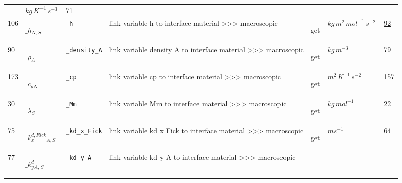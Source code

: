 \begin{longtable}{|p{1cm}|p{2.5cm}|p{4.5cm}|p{8cm}|p{3.0cm}|p{3cm}|p{1cm}|}
             & $ kg \,K^{-1} \,s^{-3} \, $
             &                 \hyperlink{"e:71"}{ 71 }
                 \\
            106
             & \hypertarget{"v:106"}{ $ {{\_h}}{_{N, S}} $}
             & \verb|_h|
             & link variable h to interface material >>> macroscopic
             & \begin{lay}get \end{lay}
             & $ kg \,m^{2} \,mol^{-1} \,s^{-2} \, $
             &                 \hyperlink{"e:92"}{ 92 }
                 \\
            90
             & \hypertarget{"v:90"}{ $ {{\_\rho}}{_{A}} $}
             & \verb|_density_A|
             & link variable density A to interface material >>> macroscopic
             & \begin{lay}get \end{lay}
             & $ kg \,m^{-3} \, $
             &                 \hyperlink{"e:79"}{ 79 }
                 \\
            173
             & \hypertarget{"v:173"}{ $ {{\_c_p}}{_{N}} $}
             & \verb|_cp|
             & link variable cp to interface material >>> macroscopic
             & \begin{lay}get \end{lay}
             & $ m^{2} \,K^{-1} \,s^{-2} \, $
             &                 \hyperlink{"e:157"}{ 157 }
                 \\
            30
             & \hypertarget{"v:30"}{ $ {{\_\lambda}}{_{S}} $}
             & \verb|_Mm|
             & link variable Mm to interface material >>> macroscopic
             & \begin{lay}get \end{lay}
             & $ kg \,mol^{-1} \, $
             &                 \hyperlink{"e:22"}{ 22 }
                 \\
            75
             & \hypertarget{"v:75"}{ $ {{\_k^{d,Fick}_x}}{_{A, S}} $}
             & \verb|_kd_x_Fick|
             & link variable kd x Fick to interface material >>> macroscopic
             & \begin{lay}get \end{lay}
             & $ m s^{-1} \, $
             &                 \hyperlink{"e:64"}{ 64 }
                 \\
            77
             & \hypertarget{"v:77"}{ $ {{\_k^d_y}}{_{A, S}} $}
             & \verb|_kd_y_A|
             & link variable kd y A to interface material >>> macroscopic

\end{longtable}
